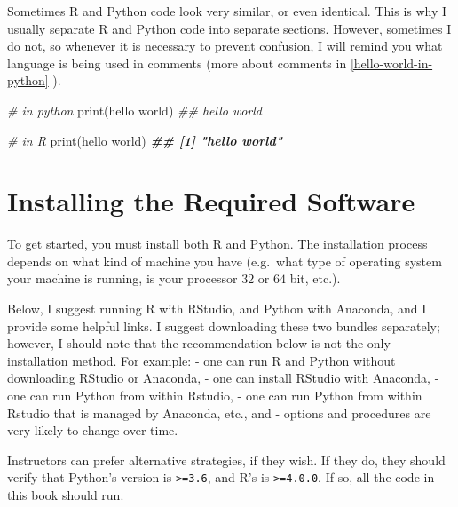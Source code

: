 \documentclass[
  12pt,
  krantz2]{krantz}
\makeatletter
\newenvironment{Shaded}{\begin{snugshade}}{\end{snugshade}}
\newcommand{\BuiltInTok}[1]{#1}
\newcommand{\CommentTok}[1]{\textcolor[rgb]{0.37,0.37,0.37}{\textit{#1}}}
\newcommand{\DocumentationTok}[1]{\textcolor[rgb]{0.37,0.37,0.37}{\textbf{\textit{#1}}}}
\newcommand{\FunctionTok}[1]{\textcolor[rgb]{0,0,0}{#1}}
\newcommand{\NormalTok}[1]{#1}
\newcommand{\StringTok}[1]{\textcolor[rgb]{0.5,0.5,0.5}{#1}}
\newenvironment{kframe}{%
\medskip{}
\setlength{\fboxsep}{.8em}
 \def\at@end@of@kframe{}%
 \ifinner\ifhmode%
  \def\at@end@of@kframe{\end{minipage}}%
  \begin{minipage}{\columnwidth}%
 \fi\fi%
 \def\FrameCommand##1{\hskip\@totalleftmargin \hskip-\fboxsep
 \colorbox{shadecolor}{##1}\hskip-\fboxsep
     \hskip-\linewidth \hskip-\@totalleftmargin \hskip\columnwidth}%
 \MakeFramed {\advance\hsize-\width
   \@totalleftmargin\z@ \linewidth\hsize
   \@setminipage}}%
 {\par\unskip\endMakeFramed%
 \at@end@of@kframe}
\renewenvironment{Shaded}{\begin{kframe}}{\end{kframe}}
\makeatother
\begin{document}
Sometimes R and Python code look very similar, or even identical. This is why I usually separate R and Python code into separate sections. However, sometimes I do not, so whenever it is necessary to prevent confusion, I will remind you what language is being used in comments (more about comments in \ref{hello-world-in-python} ).

\begin{Shaded}
\begin{Highlighting}[]
\CommentTok{\# in python}
\BuiltInTok{print}\NormalTok{(}\StringTok{\textquotesingle{}hello world\textquotesingle{}}\NormalTok{)}
\CommentTok{\#\# hello world}
\end{Highlighting}
\end{Shaded}

\begin{Shaded}
\begin{Highlighting}[]
\CommentTok{\# in R}
\FunctionTok{print}\NormalTok{(}\StringTok{\textquotesingle{}hello world\textquotesingle{}}\NormalTok{)}
\DocumentationTok{\#\# [1] "hello world"}
\end{Highlighting}
\end{Shaded}

\hypertarget{installing-the-required-software}{%
\section*{Installing the Required Software}\label{installing-the-required-software}}


To get started, you must install both R and Python. The installation process depends on what kind of machine you have (e.g.~what type of operating system your machine is running, is your processor \(32\) or \(64\) bit, etc.).

Below, I suggest running R with RStudio, and Python with Anaconda, and I provide some helpful links. I suggest downloading these two bundles separately; however, I should note that the recommendation below is not the only installation method. For example:
- one can run R and Python without downloading RStudio or Anaconda,
- one can install RStudio with Anaconda,
- one can run Python from within Rstudio,
- one can run Python from within Rstudio that is managed by Anaconda, etc., and
- options and procedures are very likely to change over time.

Instructors can prefer alternative strategies, if they wish. If they do, they should verify that Python's version is \texttt{\textgreater{}=3.6}, and R's is \texttt{\textgreater{}=4.0.0}. If so, all the code in this book should run.
\end{document}
